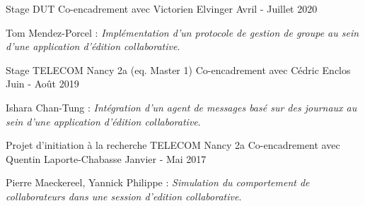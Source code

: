 
\begin{cventries}

\cventry
  {Stage DUT}
  {Co-encadrement avec Victorien Elvinger}
  {}
  {Avril - Juillet 2020}
  {
    \begin{cvparagraph}
      Tom Mendez-Porcel : \emph{Implémentation d'un protocole de gestion de groupe au sein d'une application d'édition collaborative}.
    \end{cvparagraph}
  }

\vspace{-1em}
\cventry
  {Stage TELECOM Nancy 2a (eq. Master 1)}
  {Co-encadrement avec Cédric Enclos}
  {}
  {Juin - Août 2019}
  {
    \begin{cvparagraph}
      Ishara Chan-Tung : \emph{Intégration d'un agent de messages basé sur des journaux au sein d'une application d'édition collaborative}.
    \end{cvparagraph}
}

\vspace{-1em}
\cventry
  {Projet d'initiation à la recherche TELECOM Nancy 2a}
  {Co-encadrement avec Quentin Laporte-Chabasse}
  {}
  {Janvier - Mai 2017}
  {
    \begin{cvparagraph}
      Pierre Maeckereel, Yannick Philippe : \emph{Simulation du comportement de collaborateurs dans une session d'edition collaborative}.
    \end{cvparagraph}
  }
\end{cventries}
